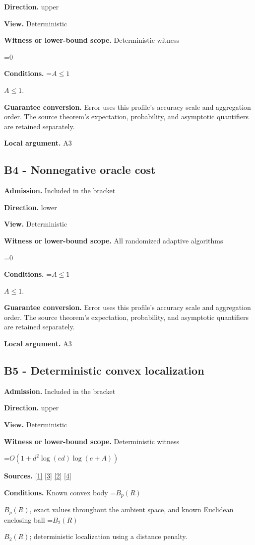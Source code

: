 \documentclass[10pt,a4paper]{article}
\newcommand{\AtlasMath}[1]{\par\begingroup\centering\setbox0=\hbox{$\displaystyle #1$}\ifdim\wd0>1.4\linewidth\typeout{ATLAS WIDE FORMULA: \the\wd0}\fi\ifdim\wd0>\linewidth\resizebox{\linewidth}{!}{\box0}\else\box0\fi\par\endgroup}
\newcommand{\AtlasInlineMath}[1]{\begingroup\setbox0=\hbox{$#1$}\ifdim\wd0>.4\linewidth\endgroup\AtlasMath{#1}\else\endgroup$#1$\fi}
\begin{document}
\textbf{Direction.} upper

\textbf{View.} Deterministic

\textbf{Witness or lower-bound scope.} Deterministic witness

\AtlasMath{0}
\textbf{Conditions.} \AtlasInlineMath{A\le1}.

\textbf{Guarantee conversion.} Error uses this profile's accuracy scale and aggregation order. The source theorem's expectation, probability, and asymptotic quantifiers are retained separately.

\textbf{Local argument.} A3

\subsection{B4 - Nonnegative oracle cost}
\textbf{Admission.} Included in the bracket

\textbf{Direction.} lower

\textbf{View.} Deterministic

\textbf{Witness or lower-bound scope.} All randomized adaptive algorithms

\AtlasMath{0}
\textbf{Conditions.} \AtlasInlineMath{A\le1}.

\textbf{Guarantee conversion.} Error uses this profile's accuracy scale and aggregation order. The source theorem's expectation, probability, and asymptotic quantifiers are retained separately.

\textbf{Local argument.} A3

\subsection{B5 - Deterministic convex localization}
\textbf{Admission.} Included in the bracket

\textbf{Direction.} upper

\textbf{View.} Deterministic

\textbf{Witness or lower-bound scope.} Deterministic witness

\AtlasMath{O(1+d^2\log(ed)\log(e+A))}
\textbf{Sources.} \href{https://proceedings.neurips.cc/paper_files/paper/2022/file/329ef22fd8cb68223d5df09a037f7dd9-Paper-Conference.pdf}{[1]} \href{https://arxiv.org/html/2607.16558v2}{[3]} \href{https://arxiv.org/html/2610.00345v1}{[2]} \href{https://www.mathnet.ru/php/archive.phtml?jrnid=mzm&option_lang=eng&paperid=1697&wshow=paper}{[4]}

\textbf{Conditions.} Known convex body \AtlasInlineMath{B_p(R)}, exact values throughout the ambient space, and known Euclidean enclosing ball \AtlasInlineMath{B_2(R)}; deterministic localization using a distance penalty.
\end{document}
